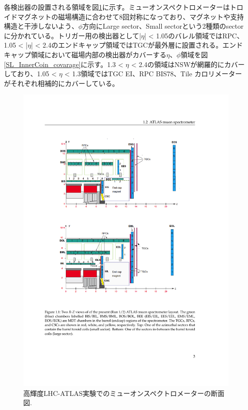 各検出器の設置される領域を図\ref{Muonspectrometer2}に示す。ミューオンスペクトロメーターはトロイドマグネットの磁場構造に合わせて8回対称になっており、マグネットや支持構造と干渉しないよう、$\phi$方向にLarge sector、Small sectorという2種類のsectorに分かれている。トリガー用の検出器として|$\eta$| < 1.05のバレル領域ではRPC、1.05 < |$\eta$| < 2.4のエンドキャップ領域ではTGCが最外層に設置される。エンドキャップ領域において磁場内部の検出器がカバーする$\eta$、$\phi$領域を図\ref{SL_InnerCoin_covarage}に示す。1.3 < $\eta$ < 2.4の領域はNSWが網羅的にカバーしており、1.05 < $\eta$ < 1.3領域ではTGC EI、RPC BIS78、Tile カロリメーターがそれぞれ相補的にカバーしている。

\begin{figure} 
    \centering
    \includegraphics[width=16cm]{fig/Intro/Muonspectrometer.pdf}
    \caption[高輝度LHC-ATLAS実験でのミューオンスペクトロメーターの断面図]{高輝度LHC-ATLAS実験でのミューオンスペクトロメーターの断面図.\cite{tdr_phase2muon_2017017}
    }
    \label{Muonspectrometer2}
\end{figure}

